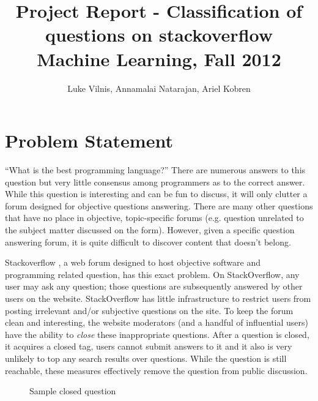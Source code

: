 \documentclass[11pt]{article}
\title{Project Report - Classification of questions on stackoverflow\\ Machine Learning, Fall 2012}
\author{Luke Vilnis, Annamalai Natarajan, Ariel Kobren}
\begin{document}
\sloppy

\maketitle

\section{Problem Statement}

``What is the best programming language?'' There are numerous answers
to this question but very little consensus among programmers as to the
correct answer. While this question is interesting and can be fun to
discuss, it will only clutter a forum designed for objective questions
answering. There are many other questions that have no place in
objective, topic-specific forums (e.g. question unrelated to the
subject matter discussed on the form). However, given a specific
question answering forum, it is quite difficult to discover content
that doesn't belong.

\noindent Stackoverflow \cite{website:stackoverflow}, a web forum
designed to host objective software and programming related question,
has this exact problem. On StackOverflow, any user may ask any
question; those questions are subsequently answered by other users on
the website. StackOverflow has little infrastructure to restrict users
from posting irrelevant and/or subjective questions on the site. To
keep the forum clean and interesting, the website moderators (and a
handful of influential users) have the ability to \emph{close} these
inappropriate questions. After a question is closed, it acquires a
closed tag, users cannot submit answers to it and it also is very
unlikely to top any search results over questions. While the question
is still reachable, these measures effectively remove the question
from public discussion.

\begin{figure}
\centering
{}
\caption{Sample closed question}
\label{fig:sample}
\end{figure}
\end{document}
